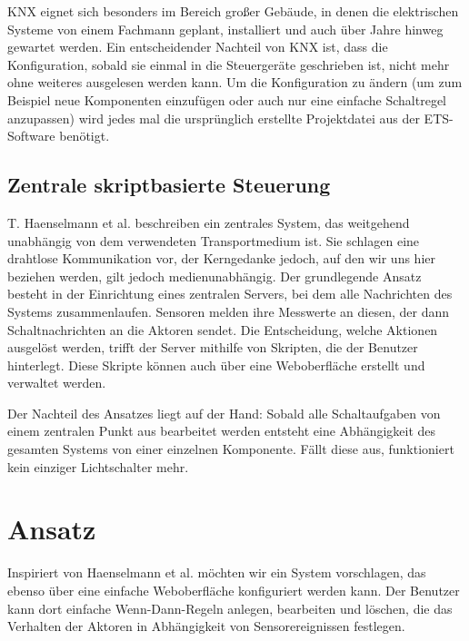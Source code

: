 \documentclass{IEEEtran}
\begin{document}
    KNX eignet sich besonders im Bereich großer Gebäude, in denen die
    elektrischen Systeme von einem Fachmann geplant, installiert und auch über
    Jahre hinweg gewartet werden. Ein entscheidender Nachteil von KNX ist,
    dass die Konfiguration, sobald sie einmal in die Steuergeräte geschrieben
    ist, nicht mehr ohne weiteres ausgelesen werden kann.
    Um die Konfiguration zu ändern (um zum Beispiel neue Komponenten einzufügen
    oder auch nur eine einfache Schaltregel anzupassen) wird jedes mal
    die ursprünglich erstellte Projektdatei aus der ETS-Software benötigt.

    \subsection{Zentrale skriptbasierte Steuerung}
        T. Haenselmann et al. \cite{haenselmann2007skriptbasierte}
        beschreiben ein zentrales System, das weitgehend
        unabhängig von dem verwendeten Transportmedium ist.
        Sie schlagen eine drahtlose Kommunikation vor,
        der Kerngedanke jedoch, auf den wir uns hier beziehen werden,
        gilt jedoch medienunabhängig.
        Der grundlegende Ansatz besteht in der Einrichtung eines zentralen
        Servers, bei dem alle Nachrichten des Systems zusammenlaufen.
        Sensoren melden ihre Messwerte an diesen, der dann Schaltnachrichten
        an die Aktoren sendet.
        Die Entscheidung, welche Aktionen ausgelöst werden, trifft der Server
        mithilfe von Skripten, die der Benutzer hinterlegt.
        Diese Skripte können auch über eine Weboberfläche erstellt und
        verwaltet werden.

        Der Nachteil des Ansatzes liegt auf der Hand:
        Sobald alle Schaltaufgaben von einem zentralen Punkt aus bearbeitet
        werden entsteht eine Abhängigkeit des gesamten Systems von einer
        einzelnen Komponente.
        Fällt diese aus, funktioniert kein einziger Lichtschalter mehr.


\section{Ansatz}
    Inspiriert von Haenselmann et al. \cite{haenselmann2007skriptbasierte}
    möchten wir ein System vorschlagen,
    das ebenso über eine einfache Weboberfläche konfiguriert werden kann.
    Der Benutzer kann dort einfache Wenn-Dann-Regeln anlegen, bearbeiten und
    löschen, die das Verhalten der Aktoren in Abhängigkeit von Sensorereignissen
    festlegen.
\end{document}

